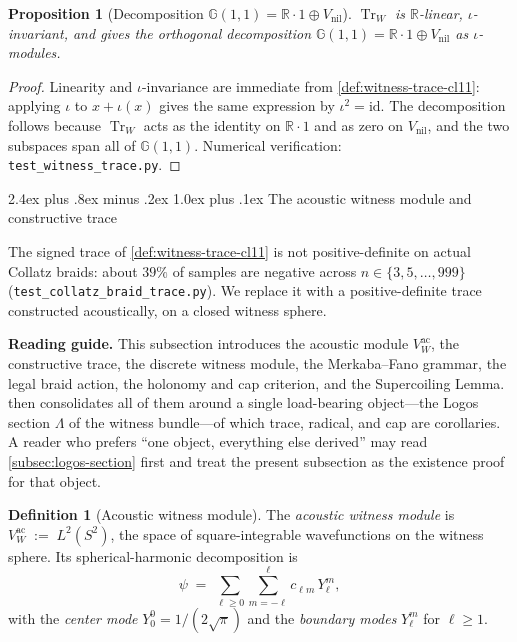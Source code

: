 \documentclass[11pt,a4paper]{article}
\makeatletter
\theoremstyle{plain}
\newtheorem{proposition}[theorem]{Proposition}
\theoremstyle{definition}
\newtheorem{definition}[theorem]{Definition}
\theoremstyle{remark}
\numberwithin{equation}{section}
\newcommand{\Cl}{\mathbb{G}}
\newcommand{\R}{\mathbb{R}}
\DeclareMathOperator{\Tr}{Tr}
\providecommand{\id}{\mathrm{id}}
\providecommand{\nil}{\mathrm{nil}}
\renewcommand{\subsection}{%
  \@startsection{subsection}{2}{0pt}%
    {2.4ex plus .8ex minus .2ex}%
    {1.0ex plus .1ex}%
    {\normalfont\Large\bfseries\color{headingAccent}}%
}
\makeatother
\begin{document}
\medskip
\begin{proposition}[Decomposition $\Cl(1,1)=\R\cdot 1\oplus V_{\nil}$]
\label{prop:cl11-decomposition}
$\Tr_W$ is $\R$-linear, $\iota$-invariant, and gives the orthogonal
decomposition $\Cl(1,1)=\R\cdot 1\oplus V_{\nil}$ as $\iota$-modules.
\end{proposition}

\begin{proof}
Linearity and $\iota$-invariance are immediate from
\cref{def:witness-trace-cl11}: applying $\iota$ to $x+\iota(x)$
gives the same expression by $\iota^2=\id$.  The decomposition
follows because $\Tr_W$ acts as the identity on $\R\cdot 1$ and as
zero on $V_{\nil}$, and the two subspaces span all of $\Cl(1,1)$.
Numerical verification: \texttt{test\_witness\_trace.py}.
\end{proof}

\subsection{The acoustic witness module and constructive trace}
\label{subsec:acoustic-witness}

The signed trace of \cref{def:witness-trace-cl11} is not
positive-definite on actual Collatz braids: about \(39\%\) of
samples are negative across \(n\in\{3,5,\dots,999\}\)
(\texttt{test\_collatz\_braid\_trace.py}).  We replace it with a
positive-definite trace constructed acoustically, on a closed
witness sphere.

\medskip\noindent
\textbf{Reading guide.}  This subsection introduces the acoustic
module \(V_W^{\mathrm{ac}}\), the constructive trace, the discrete
witness module, the Merkaba--Fano grammar, the legal braid action,
the holonomy and cap criterion, and the Supercoiling Lemma.
 then consolidates all of them around
a single load-bearing object---the Logos section \(\Lambda\) of the
witness bundle---of which trace, radical, and cap are corollaries.
A reader who prefers ``one object, everything else derived'' may
read \cref{subsec:logos-section} first and treat the present
subsection as the existence proof for that object.

\begin{definition}[Acoustic witness module]
\label{def:vw-acoustic}
The \emph{acoustic witness module} is
$V_W^{\mathrm{ac}}\;:=\;L^2(S^2)$,
the space of square-integrable wavefunctions on the witness sphere.
Its spherical-harmonic decomposition is
\[
  \psi\;=\;\sum_{\ell\ge 0}\sum_{m=-\ell}^{\ell}c_{\ell m}\,Y_\ell^m,
\]
with the \emph{center mode} $Y_0^0=1/(2\sqrt\pi)$ and the
\emph{boundary modes} $Y_\ell^m$ for $\ell\ge 1$.
\end{definition}
\end{document}
